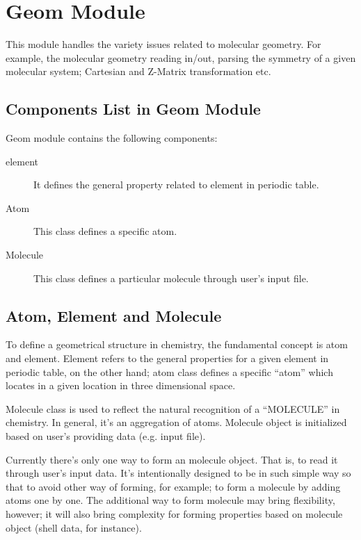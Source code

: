 %
%
\chapter{Geom Module}
%
%
%
This module handles the variety issues related to molecular geometry.
For example, the molecular geometry reading in/out, parsing the symmetry 
of a given molecular system; Cartesian and Z-Matrix transformation etc.

\section{Components List in Geom Module}

Geom module contains the following components:
\begin{description}
 \item [element] It defines the general property related to element 
 in periodic table.
 \item [Atom] This class defines a specific atom.
 \item [Molecule] This class defines a particular molecule through user's input file.
\end{description}

\section{Atom, Element and Molecule}
%
%
To define a geometrical structure in chemistry, the fundamental concept is 
atom and element. Element refers to the general properties for a given element
in periodic table, on the other hand; atom class defines a specific ``atom''
which locates in a given location in three dimensional space.

Molecule class is used to reflect the natural recognition of a ``MOLECULE''
in chemistry. In general, it's an aggregation of atoms.  Molecule object
is initialized based on user's providing data (e.g. input file).

Currently there's only one way to form an molecule object. That is, 
to read it through user's input data. It's intentionally designed to be in
such simple way so that to avoid other way of forming, for example; 
to form a molecule by adding atoms one by one. The additional way 
to form molecule may bring flexibility, however; it will also bring complexity
for forming properties based on molecule object (shell data, for instance).

